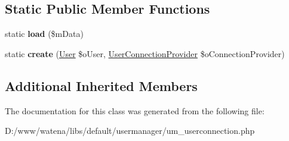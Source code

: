 \subsection*{Static Public Member Functions}
\begin{DoxyCompactItemize}
\item 
\hypertarget{class_user_connection_a9296366d73e08850aab5e6e8f81f9d32}{static {\bfseries load} (\$m\-Data)}\label{class_user_connection_a9296366d73e08850aab5e6e8f81f9d32}

\item 
\hypertarget{class_user_connection_a9439172ff42782d49cd7e7c7f36dfd2e}{static {\bfseries create} (\hyperlink{class_user}{User} \$o\-User, \hyperlink{class_user_connection_provider}{User\-Connection\-Provider} \$o\-Connection\-Provider)}\label{class_user_connection_a9439172ff42782d49cd7e7c7f36dfd2e}

\end{DoxyCompactItemize}
\subsection*{Additional Inherited Members}


The documentation for this class was generated from the following file\-:\begin{DoxyCompactItemize}
\item 
D\-:/www/watena/libs/default/usermanager/um\-\_\-userconnection.\-php\end{DoxyCompactItemize}
